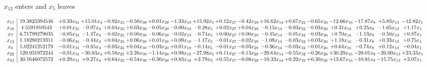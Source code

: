 \documentclass[9pt]{article}
\begin{document}
 $ x_{12} $ enters and $ x_{5} $ leaves 

 \[\begin{array}{c| c c@{\hskip 2pt} c@{\hskip 2pt} c@{\hskip 2pt} c@{\hskip 2pt} c@{\hskip 2pt} c@{\hskip 2pt} c@{\hskip 2pt} c@{\hskip 2pt} c@{\hskip 2pt} c@{\hskip 2pt} c@{\hskip 2pt} c@{\hskip 2pt} c@{\hskip 2pt} c@{\hskip 2pt} c@{\hskip 2pt} c@{\hskip 2pt} }
 x_{17}   &  19.3825394546 & +  0.33 x_{31} & + 15.01 x_{4} & -0.92 x_{25} & -0.50 x_{30} & +  0.01 x_{20} & -1.33 x_{19} & + 15.92 x_{5} & +  0.12 x_{27} & -0.42 x_{29} & + 16.62 x_{14} & +  0.67 x_{32} & -0.65 x_{26} & -12.66 x_{16} & -17.87 x_{8} & +  5.83 x_{13} & -12.82 x_{1}\\
 x_{10}   &  4.5591910543 & +  0.01 x_{31} & -0.97 x_{4} & +  0.04 x_{25} & +  0.03 x_{30} & -0.05 x_{20} & -0.00 x_{19} & -0.28 x_{5} & +  0.02 x_{27} & +  0.04 x_{29} & -0.15 x_{14} & -0.03 x_{32} & -0.03 x_{26} & +  0.31 x_{16} & +  0.25 x_{8} & -1.65 x_{13} & +  1.17 x_{1}\\
 x_{7}   &  6.71799279035 & -0.05 x_{31} & -1.47 x_{4} & -0.02 x_{25} & +  0.08 x_{30} & -0.06 x_{20} & -0.02 x_{19} & -0.74 x_{5} & +  0.00 x_{27} & +  0.00 x_{29} & -0.45 x_{14} & -0.01 x_{32} & -0.03 x_{26} & +  0.70 x_{16} & -1.13 x_{8} & -0.50 x_{13} & +  0.87 x_{1}\\
 x_{12}   &  1.18280213311 & -0.06 x_{31} & -0.44 x_{4} & +  0.04 x_{25} & +  0.06 x_{30} & +  0.01 x_{20} & +  0.09 x_{19} & -1.17 x_{5} & -0.01 x_{27} & -0.02 x_{29} & -1.08 x_{14} & -0.03 x_{32} & +  0.03 x_{26} & +  1.18 x_{16} & -0.31 x_{8} & +  0.33 x_{13} & +  0.75 x_{1}\\
 x_{6}   &  5.02241252179 & -0.01 x_{31} & -0.85 x_{4} & -0.03 x_{25} & +  0.04 x_{30} & -0.03 x_{20} & +  0.01 x_{19} & -0.14 x_{5} & -0.01 x_{27} & -0.03 x_{29} & -0.36 x_{14} & -0.03 x_{32} & -0.01 x_{26} & +  0.64 x_{16} & -0.74 x_{8} & +  0.12 x_{13} & -0.04 x_{1}\\
 x_{22}   &  129.931972244 & -0.91 x_{31} & -30.83 x_{4} & +  0.58 x_{25} & +  2.26 x_{30} & -1.14 x_{20} & +  0.98 x_{19} & -27.98 x_{5} & +  0.11 x_{27} & -0.13 x_{29} & -29.64 x_{14} & -0.55 x_{32} & -0.26 x_{26} & + 30.29 x_{16} & -28.01 x_{8} & -20.00 x_{13} & + 23.33 x_{1}\\
 x_{23}   &  30.1646072572 & +  0.29 x_{31} & +  9.27 x_{4} & +  0.64 x_{25} & -0.54 x_{30} & -0.30 x_{20} & +  0.83 x_{19} & +  2.79 x_{5} & +  0.55 x_{27} & -0.08 x_{29} & -10.33 x_{14} & +  0.22 x_{32} & +  0.30 x_{26} & + 13.67 x_{16} & -10.81 x_{8} & -15.75 x_{13} & +  3.07 x_{1}\\

\end{array}\]
\end{document}
